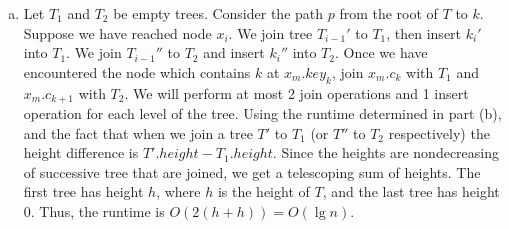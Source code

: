 \documentclass{article}
\begin{document}
\begin{enumerate}[a.]
\item Let $T_1$ and $T_2$ be empty trees.  Consider the path $p$ from the root of $T$ to $k$.  Suppose we have reached node $x_i$.  We join tree $T_{i-1}'$ to $T_1$, then insert $k_i'$ into $T_1$.  We join $T_{i-1}''$ to $T_2$ and insert $k_i''$ into $T_2$.  Once we have encountered the node which contains $k$ at $x_m.key_k$, join $x_m.c_k$ with $T_1$ and $x_m.c_{k+1}$ with $T_2$.  We will perform at most 2 join operations and 1 insert operation for each level of the tree.  Using the runtime determined in part (b), and the fact that when we join a tree $T'$ to $T_1$ (or $T''$ to $T_2$ respectively) the height difference is $T'.height - T_1.height$.  Since the heights are nondecreasing of successive tree that are joined, we get a telescoping sum of heights.  The first tree has height $h$, where $h$ is the height of $T$, and the last tree has height 0.  Thus, the runtime is $O(2(h + h)) = O(\lg n)$.


\end{enumerate}
\end{document}

